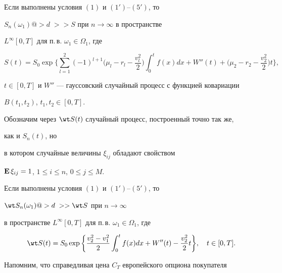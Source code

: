 \begin{thm}


Если выполнены условия $(1)$ и $(1')$--$(5')$, то


$S_n(\omega_1)@>d\;>> S$ при $n\to\infty$ в пространстве


$L^{\infty}[0, T]$ для п.\,в. $\omega_1 \in \Omega_1$, где


$$


S(t)=S_0\exp\bigg\{{\sum_{l=1}^{2}(-1)^{l+1}


\bigg({\mu_l-r_l-\frac{v^2_l}{2}} \bigg)\int_{0}^{t} f(x)dx+


W''(t)+\bigg({\mu_2-r_2- \frac{v^2_2}{2}} \bigg)t} \bigg\},


$$


$t\in[0,T]$ и $W''$ --- гауссовский случайный процесс с функцией ковариации


$B(t_1,t_2)$, $t_1, t_2\in [0,T]$.


\end{thm}





Обозначим через $\wt S(t)$ случайный процесс, построенный точно так же,


как и $S_n(t)$, но


в котором случайные величины $\xi_{ij}$ обладают свойством


$\bold E\,\xi_{ij}=1$, $1\le i\le n$, $0\le j\le M$.








\begin{thm}


Если выполнены условия $(1)$ и $(1')$--$(5')$, то


$\wt S_n(\omega_1)@>d\;>> \wt S$ при $n\to\infty$


в пространстве $L^{\infty}[0, T]$ для п.\,в. $\omega_1 \in \Omega_1$, где


$$


\wt S(t)=S_0\exp\bigg\{ {\frac{v^2_2-v^2_1}{2}\int_{0}^{t} f(x)dx+


W''(t)- \frac{v^2_2}{2}t} \bigg\} ,\quad t\in[0,T].


$$


\end{thm}





Напомним, что справедливая цена $C_T$ европейского опциона покупателя


